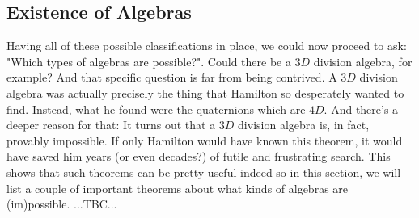 













\subsection{Existence of Algebras}
Having all of these possible classifications in place, we could now proceed to ask: "Which types of algebras are possible?". Could there be a $3D$ division algebra, for example? And that specific question is far from being contrived. A $3D$ division algebra was actually precisely the thing that Hamilton so desperately wanted to find. Instead, what he found were the quaternions which are $4D$. And there's a deeper reason for that: It turns out that a $3D$ division algebra is, in fact, provably impossible. If only Hamilton would have known this theorem, it would have saved him years (or even decades?) of futile and frustrating search. This shows that such theorems can be pretty useful indeed so in this section, we will list a couple of important theorems about what kinds of algebras are (im)possible. ...TBC...

